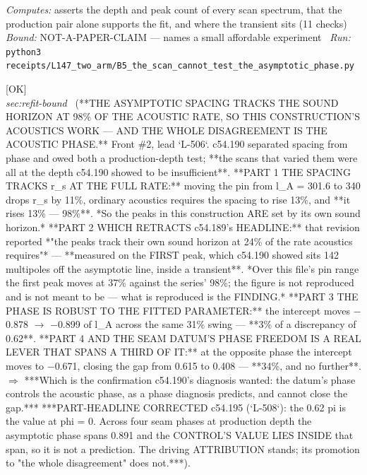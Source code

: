 \begin{description}
\emph{Computes:} asserts the depth and peak count of every scan spectrum, that the production pair alone supports the fit, and where the transient sits (11 checks)
 \emph{Bound:} NOT-A-PAPER-CLAIM --- names a small affordable experiment
\ \emph{Run:} \texttt{python3 receipts/L147\_two\_arm/B5\_the\_scan\_cannot\_test\_the\_asymptotic\_phase.py}
\item[\rcptlabel{P15_the_acoustics_work_and_the_phase_is_the_whole_disagreement}{P15R96}\textbf{P15R96}\quad\texttt{P15\_the\_acoustics\_work\_and\_the\_phase\_is\_the\_whole\_disagreement}]\hfill\textsf{[OK]}\\
\textit{sec:refit-bound} \ (**THE ASYMPTOTIC SPACING TRACKS THE SOUND HORIZON AT 98\% OF THE ACOUSTIC RATE, SO THIS CONSTRUCTION'S ACOUSTICS WORK --- AND THE WHOLE DISAGREEMENT IS THE ACOUSTIC PHASE.** Front \#2, lead `L-506`. c54.190 separated spacing from phase and owed both a production-depth test; **the scans that varied them were all at the depth c54.190 showed to be insufficient**. **PART 1 THE SPACING TRACKS r\_s AT THE FULL RATE:** moving the pin from l\_A = 301.6 to 340 drops r\_s by 11\%, ordinary acoustics requires the spacing to rise 13\%, and **it rises 13\% --- 98\%**. *So the peaks in this construction ARE set by its own sound horizon.*  **PART 2 WHICH RETRACTS c54.189's HEADLINE:** that revision reported *"the peaks track their own sound horizon at 24\% of the rate acoustics requires"* --- **measured on the FIRST peak, which c54.190 showed sits 142 multipoles off the asymptotic line, inside a transient**. *Over this file's pin range the first peak moves at 37\% against the series' 98\%; the figure is not reproduced and is not meant to be --- what is reproduced is the FINDING.* **PART 3 THE PHASE IS ROBUST TO THE FITTED PARAMETER:** the intercept moves \ensuremath{-}0.878 \ensuremath{\to} \ensuremath{-}0.899 of l\_A across the same 31\% swing --- **3\% of a discrepancy of 0.62**. **PART 4 AND THE SEAM DATUM'S PHASE FREEDOM IS A REAL LEVER THAT SPANS A THIRD OF IT:** at the opposite phase the intercept moves to \ensuremath{-}0.671, closing the gap from 0.615 to 0.408 --- **34\%, and no further**. \ensuremath{\Rightarrow} ***Which is the confirmation c54.190's diagnosis wanted: the datum's phase controls the acoustic phase, as a phase diagnosis predicts, and cannot close the gap.***  ***PART-HEADLINE CORRECTED c54.195 (`L-508`): the 0.62 pi is the value at phi = 0. Across four seam phases at production depth the asymptotic phase spans 0.891 and the CONTROL'S VALUE LIES INSIDE that span, so it is not a prediction. The driving ATTRIBUTION stands; its promotion to "the whole disagreement" does not.***). 

\end{description}
